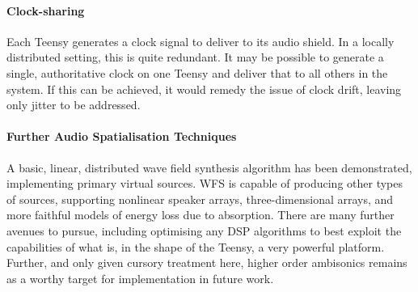 \paragraph{Clock-sharing}
Each Teensy generates a clock signal to deliver to its audio shield.
In a locally distributed setting, this is quite redundant.
It may be possible to generate a single, authoritative clock on one Teensy
and deliver that to all others in the system.
If this can be achieved, it would remedy the issue of clock drift, leaving
only jitter to be addressed.

\paragraph{Further Audio Spatialisation Techniques}
A basic, linear, distributed wave field synthesis algorithm has been
demonstrated, implementing primary virtual sources.
WFS is capable of producing other types of sources, supporting nonlinear
speaker arrays, three-dimensional arrays, and more faithful models of
energy loss due to absorption.
There are many further avenues to pursue, including optimising any DSP
algorithms to best exploit the capabilities of what is, in the shape of the
Teensy, a very powerful platform.
Further, and only given cursory treatment here, higher order ambisonics remains
as a worthy target for implementation in future work.
